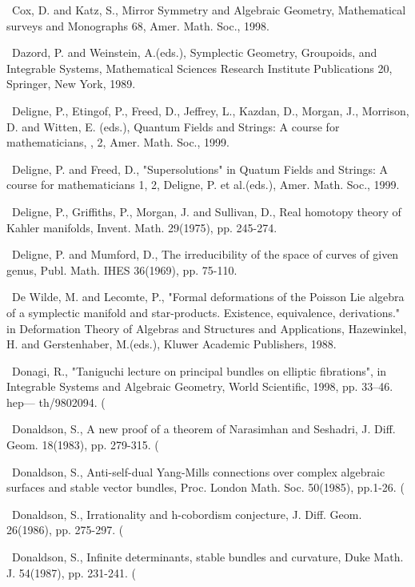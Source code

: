 {\noindent [64]\ Cox, D. and Katz, S., Mirror Symmetry and Algebraic Geometry, Mathematical surveys and Monographs 68, Amer. Math. Soc., 1998.\par\smallskip
\noindent [65]\ Dazord, P. and Weinstein, A.(eds.), Symplectic Geometry, Groupoids, and Integrable Systems, Mathematical Sciences Research Institute Publications 20, Springer, New York, 1989.\par\smallskip
\noindent [66]\ Deligne, P., Etingof, P., Freed, D., Jeffrey, L., Kazdan, D., Morgan, J., Morrison, D. and Witten, E. (eds.), Quantum Fields and Strings: A course for mathematicians, , 2, Amer. Math. Soc., 1999.\par\smallskip
\noindent [67]\ Deligne, P. and Freed, D., "Supersolutions" in Quatum Fields and Strings: A course for mathematicians 1, 2, Deligne, P. et al.(eds.), Amer. Math. Soc., 1999.\par\smallskip
\noindent [68]\ Deligne, P., Griffiths, P., Morgan, J. and Sullivan, D., Real homotopy theory of Kahler manifolds, Invent. Math. 29(1975), pp. 245-274.\par\smallskip
\noindent [69]\ Deligne, P. and Mumford, D., The irreducibility of the space of curves of given genus, Publ. Math. IHES 36(1969), pp. 75-110.\par\smallskip
\noindent [70]\ De Wilde, M. and Lecomte, P., "Formal deformations of the Poisson Lie algebra of a symplectic manifold and star-products. Existence, equivalence, derivations." in Deformation Theory of Algebras and Structures and Applications, Hazewinkel, H. and Gerstenhaber, M.(eds.), Kluwer Academic Publishers, 1988.\par\smallskip
\noindent [71]\ Donagi, R., "Taniguchi lecture on principal bundles on elliptic fibrations", in Integrable Systems and Algebraic Geometry, World Scientific, 1998, pp. 33--46. hep— th/9802094. (\par\smallskip
\noindent [72]\ Donaldson, S., A new proof of a theorem of Narasimhan and Seshadri, J. Diff. Geom. 18(1983), pp. 279-315. (\par\smallskip
\noindent [73]\ Donaldson, S., Anti-self-dual Yang-Mills connections over complex algebraic surfaces and stable vector bundles, Proc. London Math. Soc. 50(1985), pp.1-26. (\par\smallskip
\noindent [74]\ Donaldson, S., Irrationality and h-cobordism conjecture, J. Diff. Geom. 26(1986), pp. 275-297. (\par\smallskip
\noindent [75]\ Donaldson, S., Infinite determinants, stable bundles and curvature, Duke Math. J. 54(1987), pp. 231-241. (\par\smallskip
}
